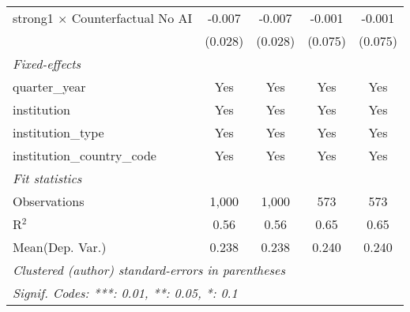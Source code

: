 \begin{tabular}{lcccc}
   strong1 $\times$ Counterfactual No AI  & -0.007  & -0.007  & -0.001  & -0.001\\   
                                          & (0.028) & (0.028) & (0.075) & (0.075)\\   
   \midrule
   \emph{Fixed-effects}\\
   quarter\_year                          & Yes     & Yes     & Yes     & Yes\\  
   institution                            & Yes     & Yes     & Yes     & Yes\\  
   institution\_type                      & Yes     & Yes     & Yes     & Yes\\  
   institution\_country\_code             & Yes     & Yes     & Yes     & Yes\\  
   \midrule
   \emph{Fit statistics}\\
   Observations                           & 1,000   & 1,000   & 573     & 573\\  
   R$^2$                                  & 0.56    & 0.56    & 0.65    & 0.65\\  
Mean(Dep. Var.) & 0.238 & 0.238 & 0.240 & 0.240 \\
   \midrule \midrule
   \multicolumn{5}{l}{\emph{Clustered (author) standard-errors in parentheses}}\\
   \multicolumn{5}{l}{\emph{Signif. Codes: ***: 0.01, **: 0.05, *: 0.1}}\\
\end{tabular}
\par\endgroup
